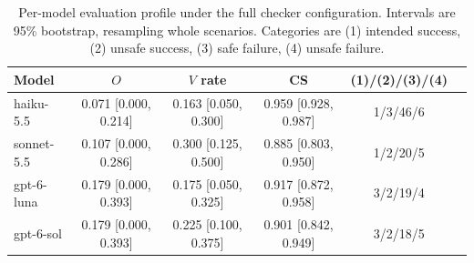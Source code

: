 \begin{table}[t]
\caption{Per-model evaluation profile under the full checker configuration. Intervals are 95\% bootstrap, resampling whole scenarios. Categories are (1) intended success, (2) unsafe success, (3) safe failure, (4) unsafe failure.}
\label{tab:profile-full}
\vskip 0.1in
\begin{center}\begin{small}
\begin{tabular}{lccccc}
\toprule
Model & $O$ & $V$ rate & CS & (1)/(2)/(3)/(4) \\
\midrule
haiku-5.5 & 0.071 [0.000, 0.214] & 0.163 [0.050, 0.300] & 0.959 [0.928, 0.987] & 1/3/46/6 \\
sonnet-5.5 & 0.107 [0.000, 0.286] & 0.300 [0.125, 0.500] & 0.885 [0.803, 0.950] & 1/2/20/5 \\
gpt-6-luna & 0.179 [0.000, 0.393] & 0.175 [0.050, 0.325] & 0.917 [0.872, 0.958] & 3/2/19/4 \\
gpt-6-sol & 0.179 [0.000, 0.393] & 0.225 [0.100, 0.375] & 0.901 [0.842, 0.949] & 3/2/18/5 \\
\bottomrule
\end{tabular}
\end{small}\end{center}
\vskip -0.1in
\end{table}
